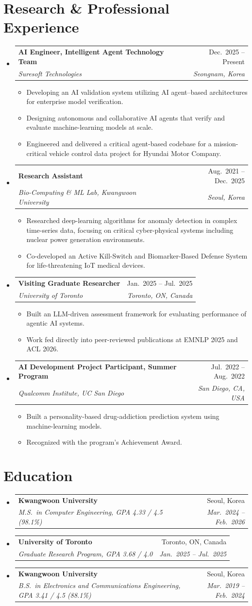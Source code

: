 \documentclass[letterpaper,11pt]{article}
\makeatletter
\newcommand{\resumeItem}[1]{
  \item\small{
    {#1 \vspace{-2pt}}
  }
}
\newcommand{\resumeSubheading}[4]{
  \vspace{-2pt}\item
    \begin{tabular*}{0.97\textwidth}[t]{l@{\extracolsep{\fill}}r}
      \textbf{#1} & #2 \\
      \textit{\small#3} & \textit{\small #4} \\
    \end{tabular*}\vspace{-7pt}
}
\newcommand{\resumeSubHeadingListStart}{\begin{itemize}[leftmargin=0.15in, label={}]}
\newcommand{\resumeSubHeadingListEnd}{\end{itemize}}
\newcommand{\resumeItemListStart}{\begin{itemize}}
\newcommand{\resumeItemListEnd}{\end{itemize}\vspace{-5pt}}
\makeatother
\begin{document}
\section{Research \& Professional Experience}
  \resumeSubHeadingListStart
    \resumeSubheading
      {AI Engineer, Intelligent Agent Technology Team}{Dec.\ 2025 -- Present}
      {Suresoft Technologies}{Seongnam, Korea}
      \resumeItemListStart
        \resumeItem{Developing an AI validation system utilizing AI agent--based architectures for enterprise model verification.}
        \resumeItem{Designing autonomous and collaborative AI agents that verify and evaluate machine-learning models at scale.}
        \resumeItem{Engineered and delivered a critical agent-based codebase for a mission-critical vehicle control data project for Hyundai Motor Company.}
      \resumeItemListEnd
    \resumeSubheading
      {Research Assistant}{Aug.\ 2021 -- Dec.\ 2025}
      {Bio-Computing \& ML Lab, Kwangwoon University}{Seoul, Korea}
      \resumeItemListStart
        \resumeItem{Researched deep-learning algorithms for anomaly detection in complex time-series data, focusing on critical cyber-physical systems including nuclear power generation environments.}
        \resumeItem{Co-developed an Active Kill-Switch and Biomarker-Based Defense System for life-threatening IoT medical devices.}
      \resumeItemListEnd
    \resumeSubheading
      {Visiting Graduate Researcher}{Jan.\ 2025 -- Jul.\ 2025}
      {University of Toronto}{Toronto, ON, Canada}
      \resumeItemListStart
        \resumeItem{Built an LLM-driven assessment framework for evaluating performance of agentic AI systems.}
        \resumeItem{Work fed directly into peer-reviewed publications at EMNLP 2025 and ACL 2026.}
      \resumeItemListEnd
    \resumeSubheading
      {AI Development Project Participant, Summer Program}{Jul.\ 2022 -- Aug.\ 2022}
      {Qualcomm Institute, UC San Diego}{San Diego, CA, USA}
      \resumeItemListStart
        \resumeItem{Built a personality-based drug-addiction prediction system using machine-learning models.}
        \resumeItem{Recognized with the program's Achievement Award.}
      \resumeItemListEnd
  \resumeSubHeadingListEnd


\section{Education}
  \resumeSubHeadingListStart
    \resumeSubheading
      {Kwangwoon University}{Seoul, Korea}
      {M.S.\ in Computer Engineering, GPA 4.33 / 4.5 (98.1\%)}{Mar.\ 2024 -- Feb.\ 2026}
    \resumeSubheading
      {University of Toronto}{Toronto, ON, Canada}
      {Graduate Research Program, GPA 3.68 / 4.0}{Jan.\ 2025 -- Jul.\ 2025}
    \resumeSubheading
      {Kwangwoon University}{Seoul, Korea}
      {B.S.\ in Electronics and Communications Engineering, GPA 3.41 / 4.5 (88.1\%)}{Mar.\ 2019 -- Feb.\ 2024}
  \resumeSubHeadingListEnd
\end{document}
